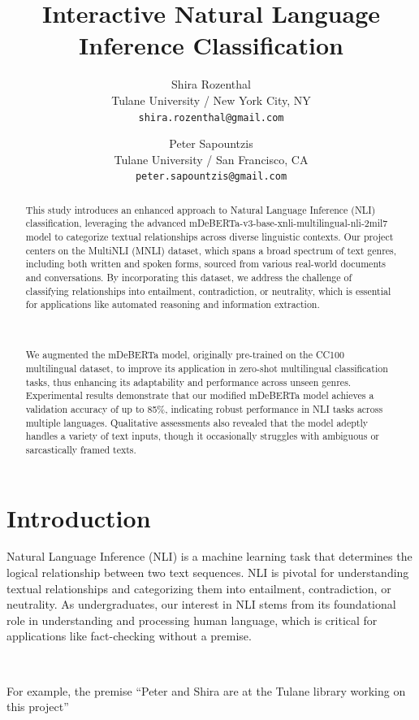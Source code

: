 \documentclass[11pt,a4paper]{article}
\title{\textbf{Interactive Natural Language Inference Classification }
}
\author{Shira Rozenthal \\
  Tulane University / New York City, NY \\
  \texttt{shira.rozenthal@gmail.com} \\
  \and
  Peter Sapountzis \\
  Tulane University / San Francisco, CA \\
  \texttt{peter.sapountzis@gmail.com}
}
\date{}
\begin{document}
\maketitle
\begin{abstract}
This study introduces an enhanced approach to Natural Language Inference (NLI) classification, leveraging the advanced mDeBERTa-v3-base-xnli-multilingual-nli-2mil7 model to categorize textual relationships across diverse linguistic contexts. Our project centers on the MultiNLI (MNLI) dataset, which spans a broad spectrum of text genres, including both written and spoken forms, sourced from various real-world documents and conversations. By incorporating this dataset, we address the challenge of classifying relationships into entailment, contradiction, or neutrality, which is essential for applications like automated reasoning and information extraction.

\\~\\

We augmented the mDeBERTa model, originally pre-trained on the CC100 multilingual dataset, to improve its application in zero-shot multilingual classification tasks, thus enhancing its adaptability and performance across unseen genres. Experimental results demonstrate that our modified mDeBERTa model achieves a validation accuracy of up to 85\%, indicating robust performance in NLI tasks across multiple languages. Qualitative assessments also revealed that the model adeptly handles a variety of text inputs, though it occasionally struggles with ambiguous or sarcastically framed texts.

\end{abstract}

\pagebreak 

\section{Introduction}
Natural Language Inference (NLI) is a machine learning task that determines the logical relationship between two text sequences. NLI is pivotal for understanding textual relationships and categorizing them into entailment, contradiction, or neutrality. As undergraduates, our interest in NLI stems from its foundational role in understanding and processing human language, which is critical for applications like fact-checking without a premise.

\

For example, the premise “Peter and Shira are at the Tulane library working on this project”
\end{document}

